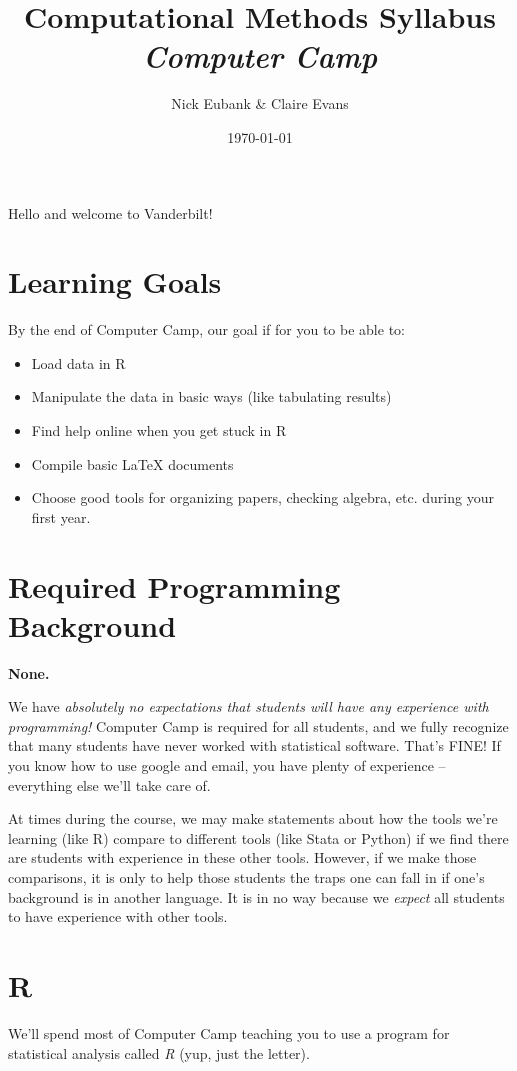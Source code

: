 \documentclass[12pt]{article}
\title{Computational Methods Syllabus \\ \emph{Computer Camp}}
\author{Nick Eubank \& Claire Evans}
\date{\today}
\begin{document}
\maketitle


Hello and welcome to Vanderbilt!

\section{Learning Goals}
By the end of Computer Camp, our goal if for you to be able to:
\begin{itemize}
    \item Load data in R
    \item Manipulate the data in basic ways (like tabulating results)
    \item Find help online when you get stuck in R
    \item Compile basic LaTeX documents
    \item Choose good tools for organizing papers, checking algebra, etc. during your first year.
\end{itemize}

\section{Required Programming Background}

{\color{red}\textbf{None.}}

We have \emph{absolutely no expectations that students will have any experience with programming!} Computer Camp is required for all students, and we fully recognize that many students have never worked with statistical software. That's FINE! If you know how to use google and email, you have plenty of experience -- everything else we'll take care of.

At times during the course, we may make statements about how the tools we're learning (like R) compare to different tools (like Stata or Python) if we find there are students with experience in these other tools. However, if we make those comparisons, it is only to help those students the traps one can fall in if one's background is in another language. It is in no way because we \emph{expect} all students to have experience with other tools.


\section{R}

We'll spend most of Computer Camp teaching you to use a program for statistical analysis called \emph{R} (yup, just the letter).
\end{document}
